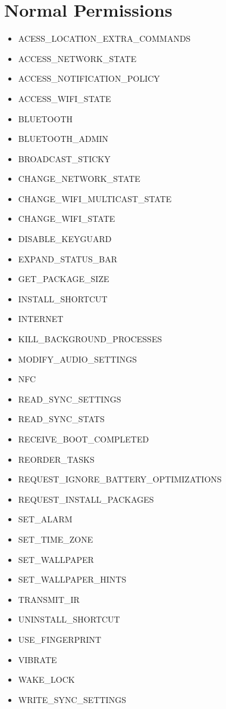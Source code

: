 \section*{Normal Permissions}
\begin{itemize}
\item[] ACESS\_LOCATION\_EXTRA\_COMMANDS
\item[] ACCESS\_NETWORK\_STATE
\item[] ACCESS\_NOTIFICATION\_POLICY
\item[] ACCESS\_WIFI\_STATE
\item[] BLUETOOTH
\item[] BLUETOOTH\_ADMIN
\item[] BROADCAST\_STICKY
\item[] CHANGE\_NETWORK\_STATE
\item[] CHANGE\_WIFI\_MULTICAST\_STATE
\item[] CHANGE\_WIFI\_STATE
\item[] DISABLE\_KEYGUARD
\item[] EXPAND\_STATUS\_BAR
\item[] GET\_PACKAGE\_SIZE
\item[] INSTALL\_SHORTCUT
\item[] INTERNET 
\item[] KILL\_BACKGROUND\_PROCESSES
\item[] MODIFY\_AUDIO\_SETTINGS
\item[] NFC
\item[] READ\_SYNC\_SETTINGS
\item[] READ\_SYNC\_STATS
\item[] RECEIVE\_BOOT\_COMPLETED
\item[] REORDER\_TASKS
\item[] REQUEST\_IGNORE\_BATTERY\_OPTIMIZATIONS
\item[] REQUEST\_INSTALL\_PACKAGES
\item[] SET\_ALARM
\item[] SET\_TIME\_ZONE
\item[] SET\_WALLPAPER
\item[] SET\_WALLPAPER\_HINTS
\item[] TRANSMIT\_IR
\item[] UNINSTALL\_SHORTCUT
\item[] USE\_FINGERPRINT
\item[] VIBRATE
\item[] WAKE\_LOCK
\item[] WRITE\_SYNC\_SETTINGS
\end{itemize}

